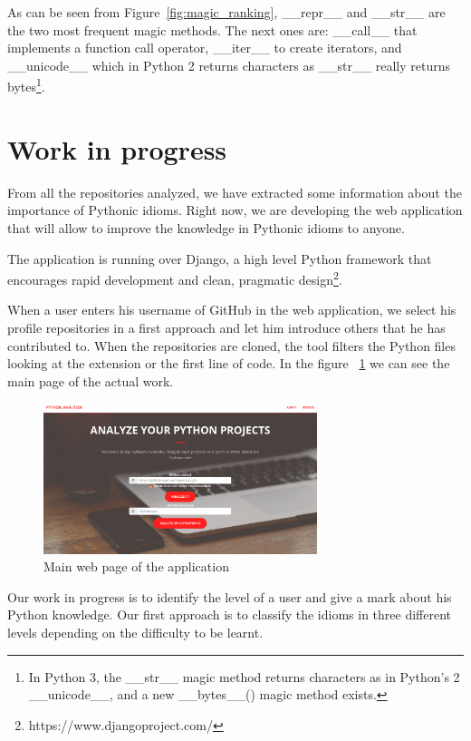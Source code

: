 \documentclass[a4paper]{article}
\begin{document}
As can be seen from Figure~\ref{fig:magic_ranking}, \_\_repr\_\_ and \_\_str\_\_ are the two most frequent magic methods. The next ones are: \_\_call\_\_ that implements a function call operator, \_\_iter\_\_ to create iterators, and \_\_unicode\_\_ which in Python 2 returns characters as \_\_str\_\_ really returns bytes\footnote{In Python 3, the \_\_str\_\_ magic method returns characters as in Python's 2 \_\_unicode\_\_, and a new \_\_bytes\_\_() magic method exists.}.


\section{Work in progress}

From all the repositories analyzed, we have extracted some information about the importance of Pythonic idioms. Right now, we are developing the web application that will allow to improve the knowledge in Pythonic idioms to anyone.

The application is running over Django, a high level Python framework that encourages rapid development and clean, pragmatic design\footnote{https://www.djangoproject.com/}.

When a user enters his username of GitHub in the web application, we select his profile repositories in a first approach and let him introduce others that he has contributed to. When the repositories are cloned, the tool filters the Python files looking at the extension or the first line of code. In the figure ~\ref{fig:main_web_page} we can see the main page of the actual work.

\begin{figure}[ht]
\centering  
\includegraphics[width=80mm]{img/main.png}
\caption{Main web page of the application}
\label{fig:main_web_page}
\end{figure}


Our work in progress is to identify the level of a user and give a mark about his Python knowledge. Our first approach is to classify the idioms in three different levels depending on the difficulty to be learnt.
\end{document}
